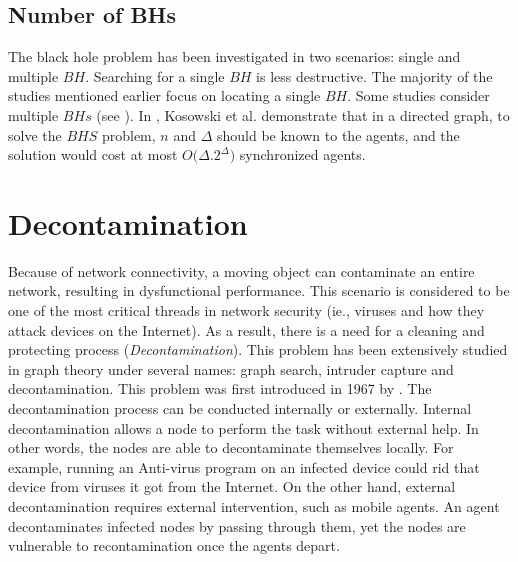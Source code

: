 \subsection{Number of BHs}
The black hole problem has been investigated in two scenarios: single and multiple $BH$. Searching for a single $BH$ is less destructive. The majority of the studies mentioned earlier focus on locating a single $BH$. Some studies consider multiple $BHs$  (see \cite{kosetal16,floetal11}). In \cite{kosetal16}, Kosowski et al. demonstrate that in a  directed graph, to solve the $BHS$ problem, $n$ and $\Delta$ should be known to the agents, and the solution would cost at most $O(\Delta$.$ 2^{\Delta})$ synchronized agents.







\section{Decontamination}

Because of network connectivity, a moving object can contaminate an entire network, resulting in dysfunctional performance. This scenario is considered to be one of the most critical threads in network security (ie.,  viruses and how they attack devices on the Internet). As a result, there is a need for a cleaning and protecting process ({\em Decontamination}). This problem has been extensively studied in graph theory under several names: graph search, intruder capture and decontamination. This problem was first introduced in 1967 by \cite{bre4}. The decontamination process can be conducted internally or externally. Internal decontamination allows a node to perform the task without external help. In other words, the nodes are able to decontaminate themselves locally. For example, running an Anti-virus program on an infected device could rid that device from viruses it got from the Internet. On the other hand, external decontamination requires external intervention, such as mobile agents. An agent decontaminates infected nodes by passing through them, yet the nodes are vulnerable to recontamination once the agents depart. 


